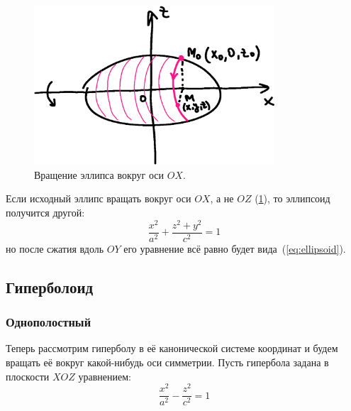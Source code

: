 \documentclass[a4paper,12pt]{article}
\begin{document}
  \begin{figure}[h]
    \centering

    \includegraphics[width=0.8\textwidth]{ellipse-rotate-2}
  
    \caption{Вращение эллипса вокруг оси $OX$.}
    \label{fig:ellipse-rotate-2}
  \end{figure}
  
  Если исходный эллипс вращать вокруг оси $OX$, а не $OZ$ (\ref{fig:ellipse-rotate-2}), то эллипсоид получится другой:
  \[
    \frac{x^2}{a^2} + \frac{z^2 + y^2}{c^2} = 1
  \]
  но после сжатия вдоль $OY$ его уравнение всё равно будет вида~(\ref{eq:ellipsoid}).
  
%
  
  
  \subsection{Гиперболоид}
  
  \subsubsection{Однополостный}
  
  Теперь рассмотрим гиперболу в её канонической системе координат и будем вращать её вокруг какой-нибудь оси симметрии.
  Пусть гипербола задана в плоскости $XOZ$ уравнением:
  \[
    \frac{x^2}{a^2} - \frac{z^2}{c^2} = 1
  \]
  
\end{document}
